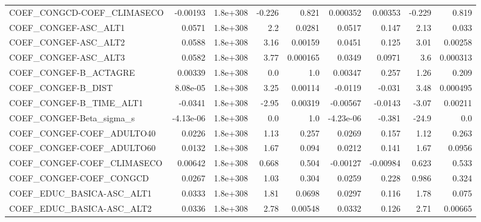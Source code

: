 \begin{tabular}{lrrrrrrrr}
COEF\_CONGCD-COEF\_CLIMASECO        &    -0.00193 &     1.8e+308 &  -0.226 &    0.821 &   0.000352 &     0.00353 &       -0.229 &         0.819 \\
COEF\_CONGEF-ASC\_ALT1              &      0.0571 &     1.8e+308 &     2.2 &   0.0281 &     0.0517 &       0.147 &         2.13 &         0.033 \\
COEF\_CONGEF-ASC\_ALT2              &      0.0588 &     1.8e+308 &    3.16 &  0.00159 &     0.0451 &       0.125 &         3.01 &       0.00258 \\
COEF\_CONGEF-ASC\_ALT3              &      0.0582 &     1.8e+308 &    3.77 & 0.000165 &     0.0349 &      0.0971 &          3.6 &      0.000313 \\
COEF\_CONGEF-B\_ACTAGRE             &     0.00339 &     1.8e+308 &     0.0 &      1.0 &    0.00347 &       0.257 &         1.26 &         0.209 \\
COEF\_CONGEF-B\_DIST                &    8.08e-05 &     1.8e+308 &    3.25 &  0.00114 &    -0.0119 &      -0.031 &         3.48 &      0.000495 \\
COEF\_CONGEF-B\_TIME\_ALT1           &     -0.0341 &     1.8e+308 &   -2.95 &  0.00319 &   -0.00567 &     -0.0143 &        -3.07 &       0.00211 \\
COEF\_CONGEF-Beta\_sigma\_s          &   -4.13e-06 &     1.8e+308 &     0.0 &      1.0 &  -4.23e-06 &      -0.381 &        -24.9 &           0.0 \\
COEF\_CONGEF-COEF\_ADULTO40         &      0.0226 &     1.8e+308 &    1.13 &    0.257 &     0.0269 &       0.157 &         1.12 &         0.263 \\
COEF\_CONGEF-COEF\_ADULTO60         &      0.0132 &     1.8e+308 &    1.67 &    0.094 &     0.0212 &       0.141 &         1.67 &        0.0956 \\
COEF\_CONGEF-COEF\_CLIMASECO        &     0.00642 &     1.8e+308 &   0.668 &    0.504 &   -0.00127 &    -0.00984 &        0.623 &         0.533 \\
COEF\_CONGEF-COEF\_CONGCD           &      0.0267 &     1.8e+308 &    1.03 &    0.304 &     0.0259 &       0.228 &        0.986 &         0.324 \\
COEF\_EDUC\_BASICA-ASC\_ALT1         &      0.0333 &     1.8e+308 &    1.81 &   0.0698 &     0.0297 &       0.116 &         1.78 &         0.075 \\
COEF\_EDUC\_BASICA-ASC\_ALT2         &      0.0336 &     1.8e+308 &    2.78 &  0.00548 &     0.0332 &       0.126 &         2.71 &       0.00665 \\

\end{tabular}
